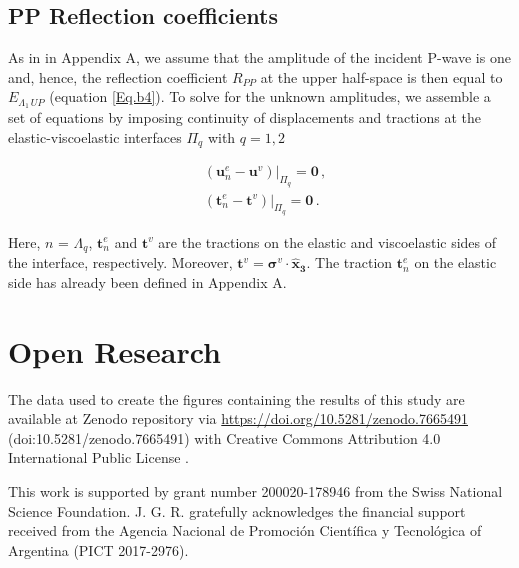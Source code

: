 \documentclass[draft]{agujournal2019}
\begin{document}
\subsection{PP Reflection coefficients}
As in in Appendix A, we assume that the amplitude of the incident P-wave is one and, hence, the reflection coefficient $R_{PP}$ at the upper half-space is then equal to $E_{\Lambda_1\, UP}$ (equation \eqref{Eq.b4}). To solve for the unknown amplitudes, we assemble a set of equations by imposing continuity of displacements and tractions at the elastic-viscoelastic interfaces $\Pi_q$ with $q=1,2$
\begin{linenomath*}
\begin{equation}\label{Eq.b10}
\begin{split}
&  \left. \left(  \bm{u}_n^e -  \bm{u}^v \right) \right \rvert_{\Pi_q} = \bm{0} \,, \\
&  \left. \left( \bm{t}_n^e  - \bm{t}^v  \right) \right \rvert_{\Pi_q} = \bm{0} \,.
\end{split}
\end{equation}
\end{linenomath*}
Here, $n$ = $\Lambda_q$, $\bm{t}_n^e$ and $\bm{t}^v$ are the tractions on the elastic and viscoelastic sides of the interface, respectively. Moreover, $\bm{t}^v =\bm{\sigma}^v \cdot \bm{\hat {x}_3} $. The traction $\bm{t}_n^e$ on the elastic side has already been defined in Appendix A.

\section{Open Research}
The data used to create the figures containing the results of this study are available at Zenodo repository via \url{https://doi.org/10.5281/zenodo.7665491} (doi:10.5281/zenodo.7665491) with Creative Commons Attribution 4.0 International Public License \cite{edith_sotelo_2023_7665491}.

%

\acknowledgments
This work is supported by grant number 200020-178946 from the Swiss National Science Foundation. J. G. R. gratefully acknowledges the financial support received from the Agencia Nacional de Promoción Científica y Tecnológica of Argentina (PICT 2017-2976).

\end{document}
